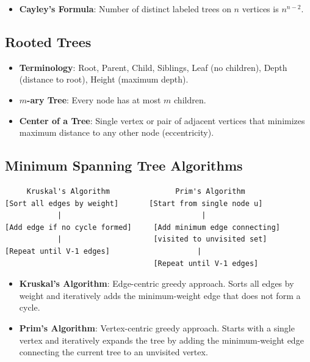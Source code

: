 \documentclass[
]{book}
\providecommand{\tightlist}{%
  \setlength{\itemsep}{0pt}\setlength{\parskip}{0pt}}
\theoremstyle{definition}
\theoremstyle{definition}
\theoremstyle{definition}
\theoremstyle{definition}
\theoremstyle{remark}
\begin{document}
\begin{itemize}
\tightlist
\item
  \textbf{Cayley's Formula}: Number of distinct labeled trees on \(n\) vertices is \(n^{n-2}\).
\end{itemize}

\subsection{Rooted Trees}\label{rooted-trees}

\begin{itemize}
\item
  \textbf{Terminology}: Root, Parent, Child, Siblings, Leaf (no children), Depth (distance to root), Height (maximum depth).
\item
  \textbf{\(m\)-ary Tree}: Every node has at most \(m\) children.
\item
  \textbf{Center of a Tree}: Single vertex or pair of adjacent vertices that minimizes maximum distance to any other node (eccentricity).
\end{itemize}

\subsection{Minimum Spanning Tree Algorithms}\label{minimum-spanning-tree-algorithms}

\begin{verbatim}
     Kruskal's Algorithm               Prim's Algorithm
[Sort all edges by weight]       [Start from single node u]
            |                                |
[Add edge if no cycle formed]     [Add minimum edge connecting]
            |                     [visited to unvisited set]
[Repeat until V-1 edges]                    |
                                  [Repeat until V-1 edges]
\end{verbatim}

\begin{itemize}
\item
  \textbf{Kruskal's Algorithm}: Edge-centric greedy approach. Sorts all edges by weight and iteratively adds the minimum-weight edge that does not form a cycle.
\item
  \textbf{Prim's Algorithm}: Vertex-centric greedy approach. Starts with a single vertex and iteratively expands the tree by adding the minimum-weight edge connecting the current tree to an unvisited vertex.
\end{itemize}
\end{document}
